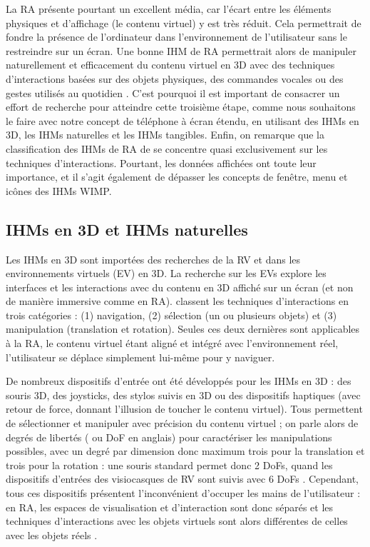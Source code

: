 La RA présente pourtant un excellent média, car l'écart entre les éléments physiques et d'affichage (le contenu virtuel) y est très réduit. Cela permettrait de fondre la présence de l'ordinateur dans l'environnement de l'utilisateur sans le restreindre sur un écran. Une bonne IHM de RA permettrait alors de manipuler naturellement et efficacement du contenu virtuel en 3D avec des techniques d'interactions basées sur des objets physiques, des commandes vocales ou des gestes utilisés au quotidien \citep{Billinghurst2005}. C'est pourquoi il est important de consacrer un effort de recherche pour atteindre cette troisième étape, comme nous souhaitons le faire avec notre concept de téléphone à écran étendu, en utilisant des IHMs en 3D, les IHMs naturelles et les IHMs tangibles. Enfin, on remarque que la classification des IHMs de RA de \cite{Billinghurst2015} se concentre quasi exclusivement sur les techniques d'interactions. Pourtant, les données affichées ont toute leur importance, et il s'agit également de dépasser les concepts de fenêtre, menu et icônes des IHMs WIMP.

\subsection{IHMs en 3D et IHMs naturelles}
\label{subsec:litterature_ar_hci_interactions}

Les IHMs en 3D sont importées des recherches de la RV et dans les environnements virtuels (EV) en 3D. La recherche sur les EVs explore les interfaces et les interactions avec du contenu en 3D affiché sur un écran (et non de manière immersive comme en RA). \cite{Bowman2004} classent les techniques d'interactions en trois catégories : (1) navigation, (2) sélection (un ou plusieurs objets) et (3) manipulation (translation et rotation). Seules ces deux dernières sont applicables à la RA, le contenu virtuel étant aligné et intégré avec l'environnement réel, l'utilisateur se déplace simplement lui-même pour y naviguer.

De nombreux dispositifs d'entrée ont été développés pour les IHMs en 3D : des souris 3D, des joysticks, des stylos suivis en 3D ou des dispositifs haptiques (avec retour de force, donnant l'illusion de toucher le contenu virtuel). Tous permettent de sélectionner et manipuler avec précision du contenu virtuel ; on parle alors de degrés de libertés ( ou DoF en anglais) pour caractériser les manipulations possibles, avec un degré par dimension donc maximum trois pour la translation et trois pour la rotation : une souris standard permet donc 2 DoFs, quand les dispositifs d'entrées des visiocasques de RV sont suivis avec 6 DoFs . Cependant, tous ces dispositifs présentent l'inconvénient d'occuper les mains de l'utilisateur : en RA, les espaces de visualisation et d'interaction sont donc séparés  et les techniques d'interactions avec les objets virtuels sont alors différentes de celles avec les objets réels \citep{Billinghurst2015}.

